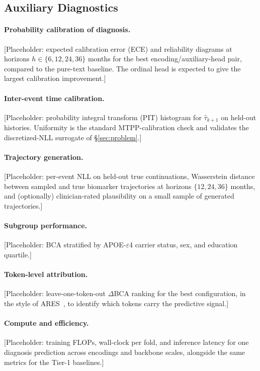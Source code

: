 \documentclass{article}
\begin{document}
\subsection{Auxiliary Diagnostics}
\label{app:diagnostics}

\paragraph{Probability calibration of diagnosis.}
[Placeholder: expected calibration error (ECE) and reliability diagrams at horizons $h \in \{6, 12, 24, 36\}$ months for the best encoding/auxiliary-head pair, compared to the pure-text baseline. The ordinal head is expected to give the largest calibration improvement.]

\paragraph{Inter-event time calibration.}
[Placeholder: probability integral transform (PIT) histogram for $\hat\tau_{k+1}$ on held-out histories. Uniformity is the standard MTPP-calibration check and validates the discretized-NLL surrogate of \S\ref{sec:problem}.]

\paragraph{Trajectory generation.}
[Placeholder: per-event NLL on held-out true continuations, Wasserstein distance between sampled and true biomarker trajectories at horizons $\{12, 24, 36\}$ months, and (optionally) clinician-rated plausibility on a small sample of generated trajectories.]

\paragraph{Subgroup performance.}
[Placeholder: BCA stratified by APOE-$\varepsilon$4 carrier status, sex, and education quartile.]

\paragraph{Token-level attribution.}
[Placeholder: leave-one-token-out $\Delta$BCA ranking for the best configuration, in the style of ARES~\citep{renc2025foundation}, to identify which tokens carry the predictive signal.]

\paragraph{Compute and efficiency.}
[Placeholder: training FLOPs, wall-clock per fold, and inference latency for one diagnosis prediction across encodings and backbone scales, alongside the same metrics for the Tier-1 baselines.]



\newpage

\end{document}
